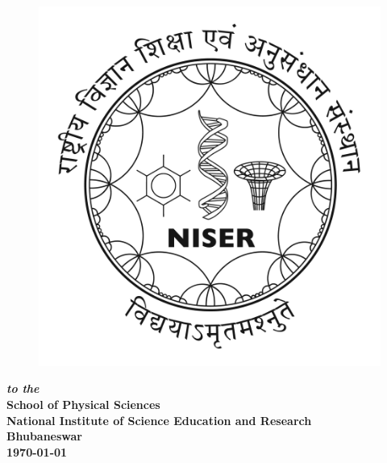 \documentclass{article}
\begin{document}
\vfill
\begin{center}
\begin{figure}[h!]
\centering
\includegraphics[scale=0.2]{Images/logo1.jpg}
\end{figure}
 {\bf {\em to the }} \\
{\bf {\large School of Physical Sciences}} \\
{\bf {\large National Institute of Science Education and Research}} \\
{\bf Bhubaneswar} \\
{\bf \today} 
\end{center}










\newpage
{}
\begin{center}
 \tableofcontents  
 \newpage
 \listoffigures
\end{center}
\restoregeometry
\end{document}
